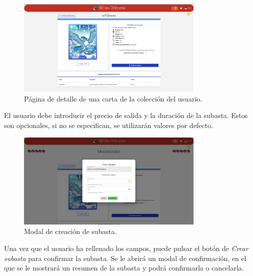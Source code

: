 \begin{figure}[H]
    \centering
    \includegraphics[width=0.8\textwidth]{figures/6-Analisis/6-Interfaz/interfaz/detalle_carta.png}
    \caption{Página de detalle de una carta de la colección del usuario.}
    \label{fig:m-interfaz-detalle-carta}
\end{figure}

El usuario debe introducir el precio de salida y la duración de la subasta. Estos son opcionales, si no se especifican, se utilizarán
valores por defecto.

\begin{figure}[H]
    \centering
    \includegraphics[width=0.8\textwidth]{figures/6-Analisis/6-Interfaz/interfaz/crear-subasta1.png}
    \caption{Modal de creación de subasta.}
    \hypertarget{fig:interfaz-subasta}{}
    \label{fig:m-interfaz-subasta}
\end{figure}


Una vez que el usuario ha rellenado los campos, puede pulsar el botón de \textit{Crear subasta} para confirmar la subasta.
Se le abrirá un modal de confirmación, en el que se le mostrará un resumen de la subasta y podrá confirmarla o cancelarla.

